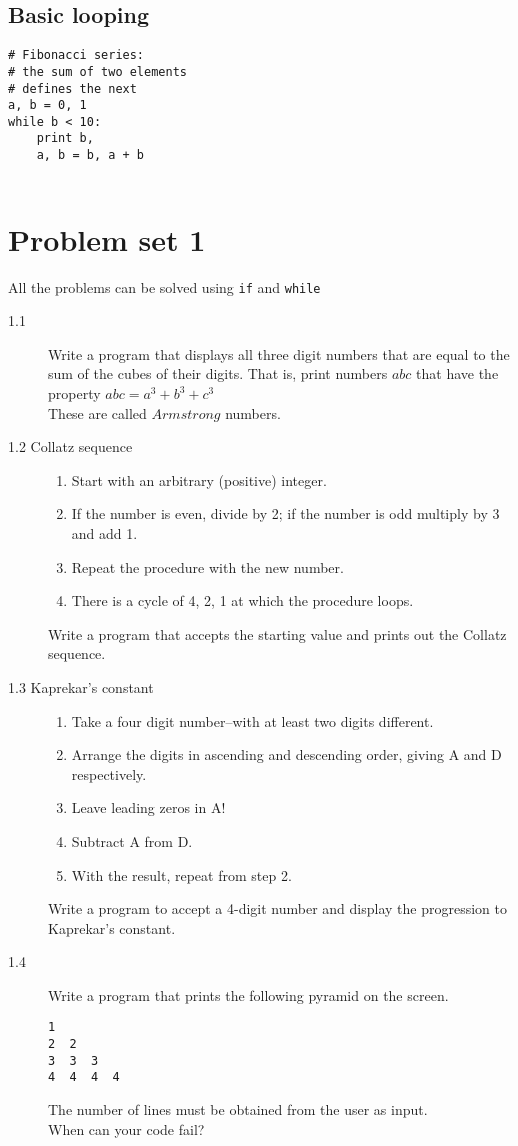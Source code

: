 \documentclass[12pt]{article}
\begin{document}
\subsection{Basic looping}
  \begin{verbatim}
# Fibonacci series:
# the sum of two elements
# defines the next
a, b = 0, 1
while b < 10:
    print b,
    a, b = b, a + b
 
\end{verbatim}

\section{Problem set 1}
All the problems can be solved using \texttt{if} and \texttt{while} 
\begin{description}
  \item[1.1] Write a program that displays all three digit numbers that are equal to the sum of the cubes of their digits. That is, print numbers $abc$ that have the property $abc = a^3 + b^3 + c^3$\\
These are called $Armstrong$ numbers.
  
\item[1.2 Collatz sequence]
\begin{enumerate}
  \item Start with an arbitrary (positive) integer. 
  \item If the number is even, divide by 2; if the number is odd multiply by 3 and add 1.
  \item Repeat the procedure with the new number.
  \item There is a cycle of 4, 2, 1 at which the procedure loops.
\end{enumerate}
    Write a program that accepts the starting value and prints out the Collatz sequence.

  \item[1.3 Kaprekar's constant]
  \begin{enumerate}
    \item Take a four digit number--with at least two digits different.
    \item Arrange the digits in ascending and descending order, giving A and D respectively.
    \item Leave leading zeros in A!
    \item Subtract A from D.
    \item With the result, repeat from step 2.
  \end{enumerate}
  Write a program to accept a 4-digit number and display the progression to Kaprekar's constant.

\item[1.4]
  Write a program that prints the following pyramid on the screen. 
  \begin{verbatim}
1
2  2
3  3  3
4  4  4  4
  \end{verbatim}
The number of lines must be obtained from the user as input.\\
When can your code fail?
\end{description}
\end{document}
